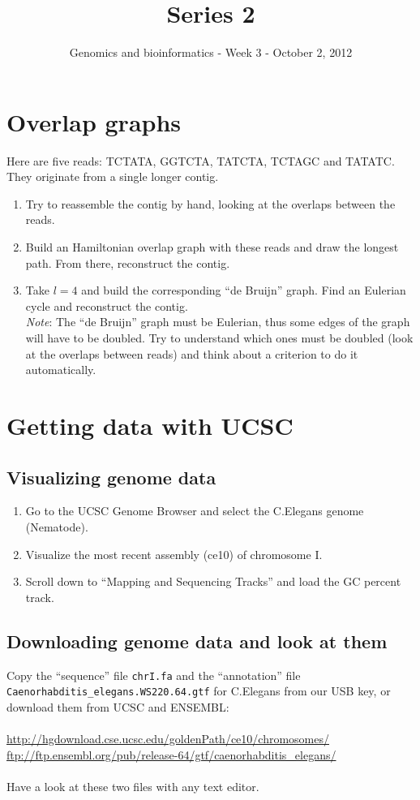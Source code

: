 \documentclass[a4paper,11pt]{article}
\title{Series 2}
\date{}
\author{Genomics and bioinformatics - Week 3 - October 2, 2012}
\begin{document}
\maketitle

\section{Overlap graphs}
Here are five reads: TCTATA, GGTCTA, TATCTA, TCTAGC and TATATC. They originate from a single longer contig.
\begin{enumerate}
\item Try to reassemble the contig by hand, looking at the overlaps between the reads.
\item Build an Hamiltonian overlap graph with these reads and draw the longest path.
From there, reconstruct the contig.
\item Take $l=4$ and build the corresponding ``de Bruijn'' graph. Find an Eulerian cycle and reconstruct the contig. \\
\textit{Note}: The ``de Bruijn'' graph must be Eulerian, thus some edges of the graph will have to be doubled.
Try to understand which ones must be doubled (look at the overlaps between reads) and think about a criterion to do it automatically.
\end{enumerate}

\section{Getting data with UCSC}
\subsection{Visualizing genome data}
\begin{enumerate}
\item Go to the UCSC Genome Browser and select the C.Elegans genome (Nematode).
\item Visualize the most recent assembly (ce10) of chromosome I.
\item Scroll down to ``Mapping and Sequencing Tracks'' and load the GC percent track.
\end{enumerate}

\subsection{Downloading genome data and look at them}
Copy the ``sequence'' file \texttt{chrI.fa} and the ``annotation'' file \texttt{Caenorhabditis\_elegans.WS220.64.gtf} for C.Elegans from our USB key, or download them from UCSC and ENSEMBL: \\\\
\url{http://hgdownload.cse.ucsc.edu/goldenPath/ce10/chromosomes/}\\
\url{ftp://ftp.ensembl.org/pub/release-64/gtf/caenorhabditis_elegans/}\\\\
Have a look at these two files with any text editor.
\end{document}
